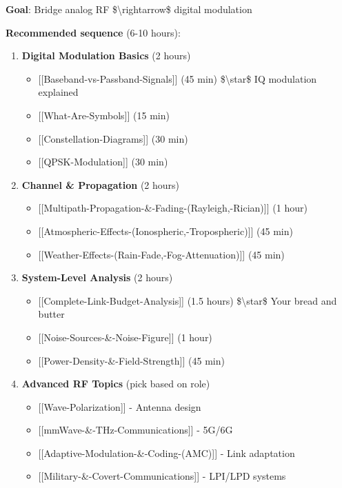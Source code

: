 \textbf{Goal}: Bridge analog RF \$\textbackslash rightarrow\$ digital
modulation

\textbf{Recommended sequence} (6-10 hours):

\begin{enumerate}
\def\labelenumi{\arabic{enumi}.}
\tightlist
\item
  \textbf{Digital Modulation Basics} (2 hours)

  \begin{itemize}
  \tightlist
  \item
    {[}{[}Baseband-vs-Passband-Signals{]}{]} (45 min)
    \$\textbackslash star\$ IQ modulation explained
  \item
    {[}{[}What-Are-Symbols{]}{]} (15 min)
  \item
    {[}{[}Constellation-Diagrams{]}{]} (30 min)
  \item
    {[}{[}QPSK-Modulation{]}{]} (30 min)
  \end{itemize}
\item
  \textbf{Channel \& Propagation} (2 hours)

  \begin{itemize}
  \tightlist
  \item
    {[}{[}Multipath-Propagation-\&-Fading-(Rayleigh,-Rician){]}{]} (1
    hour)
  \item
    {[}{[}Atmospheric-Effects-(Ionospheric,-Tropospheric){]}{]} (45 min)
  \item
    {[}{[}Weather-Effects-(Rain-Fade,-Fog-Attenuation){]}{]} (45 min)
  \end{itemize}
\item
  \textbf{System-Level Analysis} (2 hours)

  \begin{itemize}
  \tightlist
  \item
    {[}{[}Complete-Link-Budget-Analysis{]}{]} (1.5 hours)
    \$\textbackslash star\$ Your bread and butter
  \item
    {[}{[}Noise-Sources-\&-Noise-Figure{]}{]} (1 hour)
  \item
    {[}{[}Power-Density-\&-Field-Strength{]}{]} (45 min)
  \end{itemize}
\item
  \textbf{Advanced RF Topics} (pick based on role)

  \begin{itemize}
  \tightlist
  \item
    {[}{[}Wave-Polarization{]}{]} - Antenna design
  \item
    {[}{[}mmWave-\&-THz-Communications{]}{]} - 5G/6G
  \item
    {[}{[}Adaptive-Modulation-\&-Coding-(AMC){]}{]} - Link adaptation
  \item
    {[}{[}Military-\&-Covert-Communications{]}{]} - LPI/LPD systems
  \end{itemize}
\end{enumerate}

